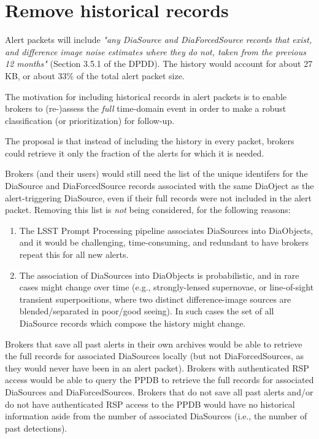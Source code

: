 \documentclass[DM,authoryear,toc]{lsstdoc}
\begin{document}
\section{Remove historical records}\label{sec:histories}

Alert packets will include \textit{"any DiaSource and DiaForcedSource records that exist, and difference image noise
estimates where they do not, taken from the previous 12 months"} (Section 3.5.1 of the DPDD).
The history would account for about 27 KB, or about 33\% of the total alert packet size.

The motivation for including historical records in alert packets is to enable brokers to (re-)assess the \emph{full} time-domain event in order to make a robust classification (or prioritization) for follow-up.

The proposal is that instead of including the history in every packet, brokers could retrieve it only the fraction of the alerts for which it is needed.

Brokers (and their users) would still need the list of the unique identifers for the DiaSource and DiaForcedSource records associated with the same DiaOject as the alert-triggering DiaSource, even if their full records were not included in the alert packet.
Removing this list is \emph{not} being considered, for the following reasons:

\begin{enumerate}
\item The LSST Prompt Processing pipeline associates DiaSources into DiaObjects, and it would be challenging, time-consuming, and redundant to have brokers repeat this for all new alerts.
\item The association of DiaSources into DiaObjects is probabilistic, and in rare cases might change over time (e.g., strongly-lensed supernovae, or line-of-sight transient superpositions, where two distinct difference-image sources are blended/separated in poor/good seeing). In such cases the set of all DiaSource records which compose the history might change.
\end{enumerate}

Brokers that save all past alerts in their own archives would be able to retrieve the full records for associated DiaSources locally (but not DiaForcedSources, as they would never have been in an alert packet).
Brokers with authenticated RSP access would be able to query the PPDB to retrieve the full records for associated DiaSources and DiaForcedSources.
Brokers that do not save all past alerts and/or do not have authenticated RSP access to the PPDB would have no historical information aside from the number of associated DiaSources (i.e., the number of past detections).
\end{document}
